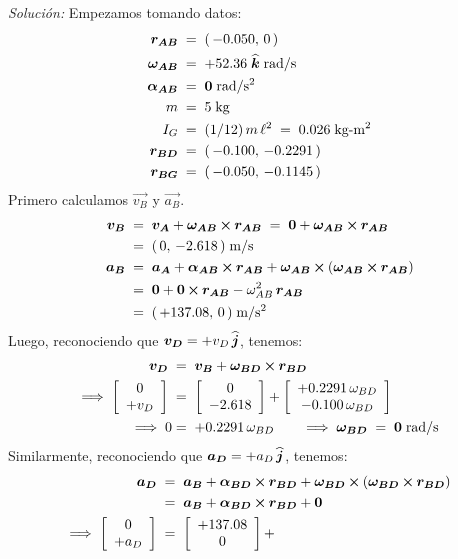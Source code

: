 \documentclass[ a4paper, twoside, 11pt]{article}
\begin{document}
\begin{problem}
\emph{Soluci\'on:} Empezamos tomando datos: 
\begin{align*}
{\boldsymbol{r_{AB}}} \; & = \; ( \, -0.050, \, 0 \, ) \\
{\boldsymbol{\omega_{AB}}} \; & = \; +52.36 \; {\boldsymbol{\widehat{k}}} \; \text{rad/s} \\
{\boldsymbol{\alpha_{AB}}} \; & = \; {\boldsymbol{0}} \; \text{rad/s\ensuremath{^{\text{2}}}} \\
m \; & = \; 5 \; \text{kg} \\
I_G \; & = \; (1/12) \, m \, \ell^2 \; = \; 0.026 \; \text{kg-m\ensuremath{^{\text{2}}}} \\
{\boldsymbol{r_{BD}}} \; & = \; ( \, -0.100, \, -0.2291 \, ) \\
{\boldsymbol{r_{BG}}} \; & = \; ( \, -0.050, \, -0.1145 \, )
\end{align*}
Primero calculamos $\vec{v_B}$ y $\vec{a_B}$. 
\begin{align*}
{\boldsymbol{v_B}} \;
& = \; {\boldsymbol{v_A}} + {\boldsymbol{\omega_{AB}}} \,{\boldsymbol{\times}}\, {\boldsymbol{r_{AB}}}
\; = \; {\boldsymbol{0}} + {\boldsymbol{\omega_{AB}}} \,{\boldsymbol{\times}}\, {\boldsymbol{r_{AB}}} \\
& = \; ( \, 0, \, -2.618 \, ) \; \text{m/s} \\
{\boldsymbol{a_B}} \;
& = \; {\boldsymbol{a_A}} + {\boldsymbol{\alpha_{AB}}} \,{\boldsymbol{\times}}\, {\boldsymbol{r_{AB}}} + {\boldsymbol{\omega_{AB}}} \,{\boldsymbol{\times}}\, ( {\boldsymbol{\omega_{AB}}} \,{\boldsymbol{\times}}\, {\boldsymbol{r_{AB}}} ) \\
& = \; {\boldsymbol{0}} + {\boldsymbol{0}} \,{\boldsymbol{\times}}\, {\boldsymbol{r_{AB}}} - \omega_{AB}^2 \, {\boldsymbol{r_{AB}}} \\
& = \; ( \, +137.08, \, 0 \, ) \; \text{m/s\ensuremath{^{\text{2}}}}
\end{align*}
Luego, reconociendo que ${\boldsymbol{v_D}} = +v_D \, {\boldsymbol{\widehat{j}}}$, tenemos: 
\begin{align*}
{\boldsymbol{v_D}} \;
& = \; {\boldsymbol{v_B}} + {\boldsymbol{\omega_{BD}}} \,{\boldsymbol{\times}}\, {\boldsymbol{r_{BD}}} \\
\Longrightarrow \; \left[ \begin{array}{c} 0 \\ +v_D \end{array} \right] \;
& = \; \left[ \begin{array}{c} 0 \\ -2.618 \end{array} \right] +
\left[ \begin{array}{c}  +0.2291 \, \omega_{BD} \\  -0.100 \, \omega_{BD} \end{array} \right] \\
\Longrightarrow \; 0 & = \; +0.2291 \, \omega_{BD} \qquad
\Longrightarrow \; {\boldsymbol{\omega_{BD}}} \; = \; {\boldsymbol{0}} \; \text{rad/s}
\end{align*}
Similarmente, reconociendo que ${\boldsymbol{a_D}} = +a_D \, {\boldsymbol{\widehat{j}}}$, tenemos: 
\begin{align*}
\vec{a_D} \;
& = \; \vec{a_B} + \vec{\alpha_{BD}} \cross \vec{r_{BD}} + \vec{\omega_{BD}} \cross ( \vec{\omega_{BD}} \cross \vec{r_{BD}} ) \\
& = \; \vec{a_B} + \vec{\alpha_{BD}} \cross \vec{r_{BD}} + \vec{0} \\
\Longrightarrow \; \colvec{0}{+a_D} \;
& = \; \colvec{+137.08}{0} +

\end{align*}
\end{problem}
\end{document}
